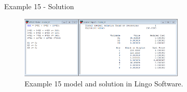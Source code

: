 \begin{frame}{Example 15 - Solution}
\begin{figure}
    \includegraphics[width=300px]{slides/ex15/screenshot.png}
    \caption{Example 15 model and solution in Lingo Software.}
\end{figure}
\end{frame}

